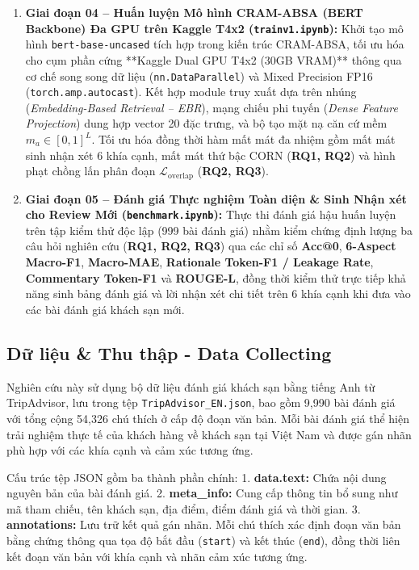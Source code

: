 \documentclass[pdflatex,sn-mathphys-num]{sn-jnl}
\theoremstyle{thmstyleone}
\theoremstyle{thmstyletwo}
\theoremstyle{thmstylethree}
\begin{document}
\begin{enumerate}
    \item \textbf{Giai đoạn 04 -- Huấn luyện Mô hình CRAM-ABSA (BERT Backbone) Đa GPU trên Kaggle T4x2 (\texttt{trainv1.ipynb}):} Khởi tạo mô hình \texttt{bert-base-uncased} tích hợp trong kiến trúc CRAM-ABSA, tối ưu hóa cho cụm phần cứng **Kaggle Dual GPU T4x2 (30GB VRAM)** thông qua cơ chế song song dữ liệu (\texttt{nn.DataParallel}) và Mixed Precision FP16 (\texttt{torch.amp.autocast}). Kết hợp module truy xuất dựa trên nhúng (\textit{Embedding-Based Retrieval -- EBR}), mạng chiếu phi tuyến (\textit{Dense Feature Projection}) dung hợp vector 20 đặc trưng, và bộ tạo mặt nạ căn cứ mềm $m_a \in [0, 1]^L$. Tối ưu hóa đồng thời hàm mất mát đa nhiệm gồm mất mát sinh nhận xét 6 khía cạnh, mất mát thứ bậc CORN (\textbf{RQ1, RQ2}) và hình phạt chồng lấn phân đoạn $\mathcal{L}_{\text{overlap}}$ (\textbf{RQ2, RQ3}).
    
    \item \textbf{Giai đoạn 05 -- Đánh giá Thực nghiệm Toàn diện \& Sinh Nhận xét cho Review Mới (\texttt{benchmark.ipynb}):} Thực thi đánh giá hậu huấn luyện trên tập kiểm thử độc lập (999 bài đánh giá) nhằm kiểm chứng định lượng ba câu hỏi nghiên cứu (\textbf{RQ1, RQ2, RQ3}) qua các chỉ số \textbf{Acc@0}, \textbf{6-Aspect Macro-F1}, \textbf{Macro-MAE}, \textbf{Rationale Token-F1 / Leakage Rate}, \textbf{Commentary Token-F1} và \textbf{ROUGE-L}, đồng thời kiểm thử trực tiếp khả năng sinh bảng đánh giá và lời nhận xét chi tiết trên 6 khía cạnh khi đưa vào các bài đánh giá khách sạn mới.
\end{enumerate}

\subsection{Dữ liệu \& Thu thập - Data Collecting}
\label{subsec:datacollecting}

Nghiên cứu này sử dụng bộ dữ liệu đánh giá khách sạn bằng tiếng Anh từ TripAdvisor, lưu trong tệp \texttt{TripAdvisor\_EN.json}, bao gồm 9,990 bài đánh giá với tổng cộng 54,326 chú thích ở cấp độ đoạn văn bản. Mỗi bài đánh giá thể hiện trải nghiệm thực tế của khách hàng về khách sạn tại Việt Nam và được gán nhãn phù hợp với các khía cạnh và cảm xúc tương ứng.

Cấu trúc tệp JSON gồm ba thành phần chính: 
1. \textbf{data.text:} Chứa nội dung nguyên bản của bài đánh giá.
2. \textbf{meta\_info:} Cung cấp thông tin bổ sung như mã tham chiếu, tên khách sạn, địa điểm, điểm đánh giá và thời gian.
3. \textbf{annotations:} Lưu trữ kết quả gán nhãn. Mỗi chú thích xác định đoạn văn bản bằng chứng thông qua tọa độ bắt đầu (\texttt{start}) và kết thúc (\texttt{end}), đồng thời liên kết đoạn văn bản với khía cạnh và nhãn cảm xúc tương ứng.
\end{document}
